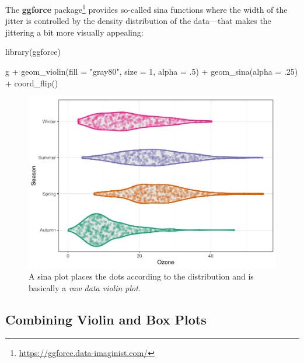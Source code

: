 \documentclass[
]{krantz}
\makeatletter
\newenvironment{Shaded}{\begin{snugshade}}{\end{snugshade}}
\newcommand{\AttributeTok}[1]{\textcolor[rgb]{0.61,0.61,0.61}{#1}}
\newcommand{\DecValTok}[1]{\textcolor[rgb]{0.06,0.06,0.06}{#1}}
\newcommand{\FunctionTok}[1]{\textcolor[rgb]{0,0,0}{#1}}
\newcommand{\NormalTok}[1]{#1}
\newcommand{\SpecialCharTok}[1]{\textcolor[rgb]{0,0,0}{#1}}
\newcommand{\StringTok}[1]{\textcolor[rgb]{0.5,0.5,0.5}{#1}}
\renewcommand{\href}[2]{#2\footnote{\url{#1}}}
\newenvironment{kframe}{%
\medskip{}
\setlength{\fboxsep}{.8em}
 \def\at@end@of@kframe{}%
 \ifinner\ifhmode%
  \def\at@end@of@kframe{\end{minipage}}%
  \begin{minipage}{\columnwidth}%
 \fi\fi%
 \def\FrameCommand##1{\hskip\@totalleftmargin \hskip-\fboxsep
 \colorbox{shadecolor}{##1}\hskip-\fboxsep
     \hskip-\linewidth \hskip-\@totalleftmargin \hskip\columnwidth}%
 \MakeFramed {\advance\hsize-\width
   \@totalleftmargin\z@ \linewidth\hsize
   \@setminipage}}%
 {\par\unskip\endMakeFramed%
 \at@end@of@kframe}
\renewenvironment{Shaded}{\begin{kframe}}{\end{kframe}}
\makeatother
\begin{document}
The \href{https://ggforce.data-imaginist.com/}{\textbf{ggforce} package} provides so-called sina functions where the width of the jitter is controlled by the density distribution of the data---that makes the jittering a bit more visually appealing:

\begin{Shaded}
\begin{Highlighting}[]
\FunctionTok{library}\NormalTok{(ggforce)}

\NormalTok{g }\SpecialCharTok{+} \FunctionTok{geom\_violin}\NormalTok{(}\AttributeTok{fill =} \StringTok{"gray80"}\NormalTok{, }\AttributeTok{size =} \DecValTok{1}\NormalTok{, }\AttributeTok{alpha =}\NormalTok{ .}\DecValTok{5}\NormalTok{) }\SpecialCharTok{+}
    \FunctionTok{geom\_sina}\NormalTok{(}\AttributeTok{alpha =}\NormalTok{ .}\DecValTok{25}\NormalTok{) }\SpecialCharTok{+}
    \FunctionTok{coord\_flip}\NormalTok{()}
\end{Highlighting}
\end{Shaded}

\begin{figure}
\centering
\includegraphics{bookdown_files/figure-latex/violin-sina-1.pdf}
\caption{\label{fig:violin-sina}A sina plot places the dots according to the distribution and is basically a \emph{raw data violin plot}.}
\end{figure}

\hypertarget{combining-violin-and-box-plots}{%
\subsection{Combining Violin and Box Plots}\label{combining-violin-and-box-plots}}
\end{document}
